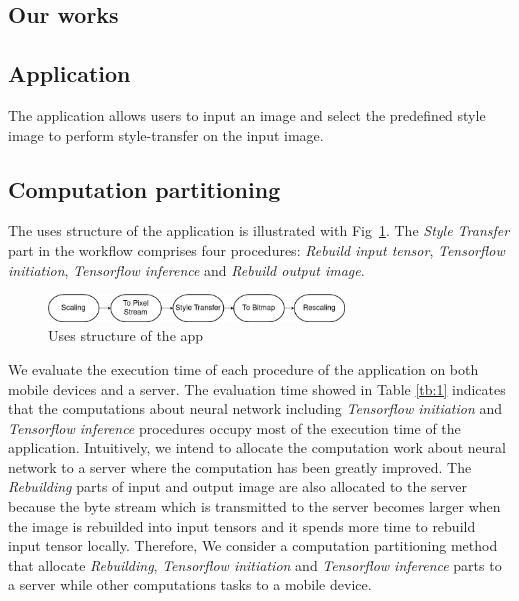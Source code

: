 \documentclass[a4paper,11pt,onecolumn,twoside]{article}
\begin{document}
\begin{CJK*}{GBK}{song}
\section{Our works}
\subsection{Application}
The application allows users to input an image and select the predefined
style image to perform style-transfer on the input image. 


\subsection{Computation partitioning}

The uses structure of the application is illustrated with Fig~\ref{uses}.
The \emph{Style Transfer} part in the workflow comprises four procedures: 
\textit{Rebuild input tensor}, \textit{Tensorflow initiation}, 
\textit{Tensorflow inference} and \textit{Rebuild output image}.

\begin{figure}[!htb] %
  \centering %
  \includegraphics[width=0.7\textwidth]{uses} %
  \caption{Uses structure of the app} %
  \label{uses} %
\end{figure}

We evaluate the execution time of each procedure of the application
on both mobile devices and a server.
The evaluation time showed in Table \ref{tb:1} indicates that the 
computations about neural network including 
\textit{Tensorflow initiation}
and \textit{Tensorflow inference}\cite{tensorflow2015-whitepaper} 
procedures occupy most of the execution time of the application. 
Intuitively, we intend to allocate the computation
work about neural network to a server where 
the computation has been greatly improved.
The \textit{Rebuilding} parts of input and output image are also
allocated to the server because the byte stream which is transmitted
to the server becomes larger when the image is rebuilded into 
input tensors and it spends more time to rebuild input tensor locally.
Therefore, We consider a computation partitioning method that
allocate \textit{Rebuilding}, \textit{Tensorflow initiation}
  and \textit{Tensorflow inference} parts 
  to a server while other computations tasks to a mobile device.


\end{CJK*}
\end{document}

